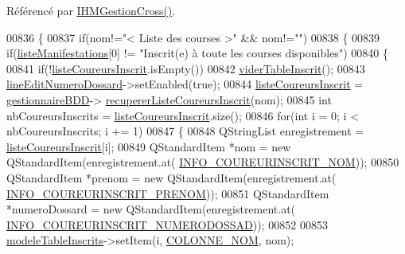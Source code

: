 Référencé par \hyperlink{class_i_h_m_gestion_cross_a2c62fd83326a87456a403f46acc408c8}{I\+H\+M\+Gestion\+Cross()}.


\begin{DoxyCode}
00836 \{
00837     \textcolor{keywordflow}{if}(nom!=\textcolor{stringliteral}{"< Liste des courses >"} && nom!=\textcolor{stringliteral}{""})
00838     \{
00839         \textcolor{keywordflow}{if}(\hyperlink{class_i_h_m_gestion_cross_ac42ca910fa9802b3f63e3393aaa14e8a}{listeManifestations}[0] != \textcolor{stringliteral}{"Inscrit(e) à toute les courses disponibles"})
00840         \{
00841             \textcolor{keywordflow}{if}(!\hyperlink{class_i_h_m_gestion_cross_a6b7c699caf9ae80c89f4cf5c58ae93d6}{listeCoureursInscrit}.isEmpty())
00842                 \hyperlink{class_i_h_m_gestion_cross_ac1ca02b1cb49d9c2f60785c8bd441d60}{viderTableInscrit}();
00843             \hyperlink{class_i_h_m_gestion_cross_adeb4cfc9a218c06fca5cabc280a611e2}{lineEditNumeroDossard}->setEnabled(\textcolor{keyword}{true});
00844             \hyperlink{class_i_h_m_gestion_cross_a6b7c699caf9ae80c89f4cf5c58ae93d6}{listeCoureursInscrit} = \hyperlink{class_i_h_m_gestion_cross_a440bac63a3e51db3e2c08e883f8cafc9}{gestionnaireBDD}->
      \hyperlink{class_gestion_b_d_d_a09b547cb065256acd269c64e273c93fd}{recupererListeCoureursInscrit}(nom);
00845             \textcolor{keywordtype}{int} nbCoureursInscrits = \hyperlink{class_i_h_m_gestion_cross_a6b7c699caf9ae80c89f4cf5c58ae93d6}{listeCoureursInscrit}.size();
00846             \textcolor{keywordflow}{for}(\textcolor{keywordtype}{int} i = 0; i < nbCoureursInscrits; i += 1)
00847             \{
00848                 QStringList enregistrement = \hyperlink{class_i_h_m_gestion_cross_a6b7c699caf9ae80c89f4cf5c58ae93d6}{listeCoureursInscrit}[i];
00849                 QStandardItem *nom = \textcolor{keyword}{new} QStandardItem(enregistrement.at(
      \hyperlink{ihmgestioncross_8h_aa5b4e42123269ad7f574258d5bbb9cda}{INFO\_COUREURINSCRIT\_NOM}));
00850                 QStandardItem *prenom = \textcolor{keyword}{new} QStandardItem(enregistrement.at(
      \hyperlink{ihmgestioncross_8h_a73a7d4efe208177f86cc761b0d5fd089}{INFO\_COUREURINSCRIT\_PRENOM}));
00851                 QStandardItem *numeroDossard = \textcolor{keyword}{new} QStandardItem(enregistrement.at(
      \hyperlink{ihmgestioncross_8h_a460662db33a6d68eead7d488ee61a76c}{INFO\_COUREURINSCRIT\_NUMERODOSSAD}));
00852 
00853                 \hyperlink{class_i_h_m_gestion_cross_a19565551280115e642ceb9790c7317bc}{modeleTableInscrits}->setItem(i, \hyperlink{ihmchronocross_8h_aeee76385895c145ef5a633e6c6812603}{COLONNE\_NOM}, nom);

\end{DoxyCode}
